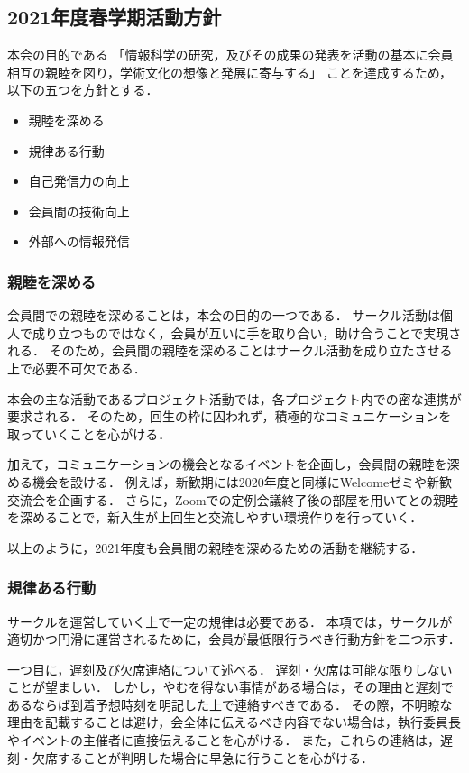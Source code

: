 \subsection*{2021年度春学期活動方針}


本会の目的である
「情報科学の研究，及びその成果の発表を活動の基本に会員相互の親睦を図り，学術文化の想像と発展に寄与する」
ことを達成するため，以下の五つを方針とする．

\begin{itemize}
  \item 親睦を深める
  \item 規律ある行動
  \item 自己発信力の向上
  \item 会員間の技術向上
  \item 外部への情報発信
\end{itemize}

\subsubsection*{親睦を深める}
  会員間での親睦を深めることは，本会の目的の一つである．
  サークル活動は個人で成り立つものではなく，会員が互いに手を取り合い，助け合うことで実現される．
  そのため，会員間の親睦を深めることはサークル活動を成り立たさせる上で必要不可欠である．

  本会の主な活動であるプロジェクト活動では，各プロジェクト内での密な連携が要求される．
  そのため，回生の枠に囚われず，積極的なコミュニケーションを取っていくことを心がける．

  加えて，コミュニケーションの機会となるイベントを企画し，会員間の親睦を深める機会を設ける．
  例えば，新歓期には2020年度と同様にWelcomeゼミや新歓交流会を企画する．
  さらに，Zoomでの定例会議終了後の部屋を用いて\firstGrade{}との親睦を深めることで，新入生が上回生と交流しやすい環境作りを行っていく．

  以上のように，2021年度も会員間の親睦を深めるための活動を継続する．

\subsubsection*{規律ある行動}
  サークルを運営していく上で一定の規律は必要である．
  本項では，サークルが適切かつ円滑に運営されるために，会員が最低限行うべき行動方針を二つ示す．

  一つ目に，遅刻及び欠席連絡について述べる．
  遅刻・欠席は可能な限りしないことが望ましい．
  しかし，やむを得ない事情がある場合は，その理由と遅刻であるならば到着予想時刻を明記した上で連絡すべきである．
  その際，不明瞭な理由を記載することは避け，会全体に伝えるべき内容でない場合は，執行委員長やイベントの主催者に直接伝えることを心がける．
  また，これらの連絡は，遅刻・欠席することが判明した場合に早急に行うことを心がける．

